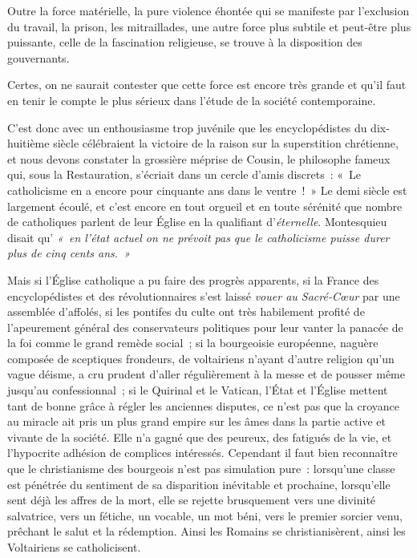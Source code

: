 \documentclass[french,twoside]{book} %
\newcommand\chaptercont{} %
\begin{document}
\chaptercont
\noindent Outre la force matérielle, la pure violence éhontée qui se manifeste par l’exclusion du travail, la prison, les mitraillades, une autre force plus subtile et peut-être plus puissante, celle de la fascination religieuse, se trouve à la disposition des gouvernants.\par
Certes, on ne saurait contester que cette force est encore très grande et qu’il faut en tenir le compte le plus sérieux dans l’étude de la société contemporaine.\par
C’est donc avec un enthousiasme trop juvénile que les encyclopédistes du dix- huitième siècle célébraient la victoire de la raison sur la superstition chrétienne, et nous devons constater la grossière méprise de Cousin, le philosophe fameux qui, sous la Restauration, s’écriait dans un cercle d’amis discrets : « Le catholicisme en a encore pour cinquante ans dans le ventre ! » Le demi siècle est largement écoulé, et c’est encore en tout orgueil et en toute sérénité que nombre de catholiques parlent de leur Église en la qualifiant d’\emph{éternelle}. Montesquieu disait qu’ \emph{« en l’état actuel on ne prévoit pas que le catholicisme puisse durer plus de cinq cents ans. »}\par
Mais si l’Église catholique a pu faire des progrès apparents, si la France des encyclopédistes et des révolutionnaires s’est laissé \emph{vouer au Sacré-Cœur}  par une assemblée d’affolés, si les pontifes du culte ont très habilement profité de l’apeurement général des conservateurs politiques pour leur vanter la panacée de la foi comme le grand remède social ; si la bourgeoisie européenne, naguère composée de sceptiques frondeurs, de voltairiens n’ayant d’autre religion qu’un vague déisme, a cru prudent d’aller régulièrement à la messe et de pousser même jusqu’au confessionnal ; si le Quirinal et le Vatican, l’État et l’Église mettent tant de bonne grâce à régler les anciennes disputes, ce n’est pas que la croyance au miracle ait pris un plus grand empire sur les âmes dans la partie active et vivante de la société. Elle n’a gagné que des peureux, des fatigués de la vie, et l’hypocrite adhésion  de complices intéressés. Cependant il faut bien reconnaître que le christianisme des bourgeois n’est pas simulation pure : lorsqu’une classe est pénétrée du sentiment de sa disparition inévitable et prochaine, lorsqu’elle sent déjà les affres de la mort, elle se rejette brusquement vers une divinité salvatrice, vers un fétiche, un vocable, un mot béni, vers le premier sorcier venu, prêchant le salut et la rédemption. Ainsi les Romains se christianisèrent, ainsi les Voltairiens se catholicisent.\par
\end{document}

